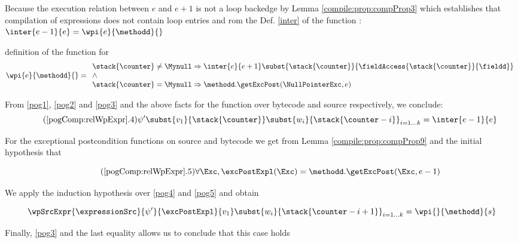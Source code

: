 \begin{description}
		  Because the execution relation between $e$ and $e+1 $ is not a loop backedge by Lemma \ref{compile:prop:compProp3}
		  which establishes that compilation of expressions does not contain loop entries and 
		  rom the Def. \ref{inter} of the function \interOnly{}:
		   $ \inter{e-1}{e} = \wpi{e}{\methodd}{}$ 
		
		 definition of the \wpName{} function for \getfield{}
		 \begin{equation*}   \wpi{e}{\methodd}{} = \\
		                     \begin{array}{l} \stack{\counter} \neq \Mynull \Rightarrow \inter{e}{e+1} \subst{\stack{\counter}}{\fieldAccess{\stack{\counter}}{\fieldd} } \\
		                      \wedge \\  
				      \stack{\counter}  = \Mynull \Rightarrow \methodd.\getExcPost(\NullPointerExc, e ) \end{array}
		\end{equation*}
		

		From \eqref{pog1}, \eqref{pog2} and  \eqref{pog3} and the above facts for the \wpName{} function over bytecode and source respectively,
		  we  conclude:
		 \begin{equation*}  	\label{pog4} \tag{\ref{pogComp:relWpExpr}.4}
		        \psi' \subst{v_1}{\stack{\counter}}\subst{w_i}{\stack{\counter - i}}_{i = 1 \ldots k} 	  = \inter{e-1}{e} 
		\end{equation*}
		
		 
		 For the exceptional postcondition functions on source and bytecode we get from Lemma \ref{compile:prop:compProp9} and the initial hypothesis that 
		
		\begin{equation*}  \label{pog5} \tag{\ref{pogComp:relWpExpr}.5}
		   \forall \Exc ,  \excPostExpl( \Exc ) = \methodd.\getExcPost(\Exc, e - 1)  
		 \end{equation*}
		
		We apply the induction hypothesis over   \eqref{pog4} and \eqref{pog5} and  obtain
		 
		\begin{equation*}   
		      \wpSrcExpr{\expressionSrc}{\psi'}{\excPostExpl }{v_1} \subst{w_i}{\stack{\counter - i + 1}}_{i = 1 \ldots k}  = \wpi{}{\methodd}{s}
		\end{equation*}
	
	        Finally,  \eqref{pog3} and the last equality allows us to conclude that this case holds


\end{description}

